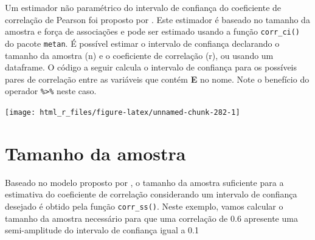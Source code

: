 \documentclass[
]{book}
\newenvironment{Shaded}{\begin{snugshade}}{\end{snugshade}}
\newcommand{\CommentTok}[1]{\textcolor[rgb]{0.56,0.35,0.01}{\textit{#1}}}
\newcommand{\DataTypeTok}[1]{\textcolor[rgb]{0.13,0.29,0.53}{#1}}
\newcommand{\FloatTok}[1]{\textcolor[rgb]{0.00,0.00,0.81}{#1}}
\newcommand{\KeywordTok}[1]{\textcolor[rgb]{0.13,0.29,0.53}{\textbf{#1}}}
\newcommand{\NormalTok}[1]{#1}
\newcommand{\OperatorTok}[1]{\textcolor[rgb]{0.81,0.36,0.00}{\textbf{#1}}}
\newcommand{\OtherTok}[1]{\textcolor[rgb]{0.56,0.35,0.01}{#1}}
\newcommand{\StringTok}[1]{\textcolor[rgb]{0.31,0.60,0.02}{#1}}
\begin{document}
Um estimador não paramétrico do intervalo de confiança do coeficiente de correlação de Pearson foi proposto por \citet{Olivoto2018}. Este estimador é baseado no tamanho da amostra e força de associações e pode ser estimado usando a função \texttt{corr\_ci()} do pacote \texttt{metan}.  É possível estimar o intervalo de confiança declarando o tamanho da amostra (n) e o coeficiente de correlação (r), ou usando um dataframe. O código a seguir calcula o intervalo de confiança para os possíveis pares de correlação entre as variáveis que contém \textbf{E} no nome. Note o benefício do operador \texttt{\%\textgreater{}\%} neste caso.

\begin{Shaded}
\end{Shaded}

\begin{center}\texttt{[image: html\_r\_files/figure-latex/unnamed-chunk-282-1]} \end{center}

\hypertarget{tamanho-da-amostra}{%
\section{Tamanho da amostra}\label{tamanho-da-amostra}}

Baseado no modelo proposto por \citet{Olivoto2018}, o tamanho da amostra suficiente para a estimativa do coeficiente de correlação considerando um intervalo de confiança desejado é obtido pela função \texttt{corr\_ss()}. Neste exemplo, vamos calcular o tamanho da amostra necessário para que uma correlação de 0.6 apresente uma semi-amplitude do intervalo de confiança igual a 0.1 

\begin{Shaded}
\end{Shaded}
\end{document}
